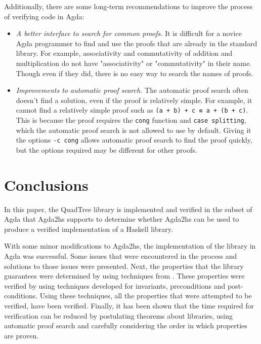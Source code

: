 Additionally, there are some long-term recommendations to improve the process of verifying code in Agda:
\begin{itemize}
	\item \textit{A better interface to search for common proofs.} It is difficult for a novice Agda programmer to find and use the proofs that are already in the standard library. For example, associativity and commutativity of addition and multiplication do not have "associativity" or "commutativity" in their name. Though even if they did, there is no easy way to search the names of proofs.
	\item \textit{Improvements to automatic proof search.} The automatic proof search often doesn't find a solution, even if the proof is relatively simple. For example, it cannot find a relatively simple proof such as \verb|(a + b) + c ≡ a + (b + c)|. This is because the proof requires the \verb|cong| function and \verb|case splitting|, which the automatic proof search is not allowed to use by default. Giving it the options \verb|-c cong| allows automatic proof search to find the proof quickly, but the options required may be different for other proofs.
\end{itemize}

\section{Conclusions}
In this paper, the QuadTree library is implemented and verified in the subset of Agda that Agda2hs supports to determine whether Agda2hs can be used to produce a verified implementation of a Haskell library. 

With some minor modifications to Agda2hs, the implementation of the library in Agda was successful. Some issues that were encountered in the process and solutions to those issues were presented. Next, the properties that the library guarantees were determined by using techniques from \cite{BREITNER2021}. These properties were verified by using techniques developed for invariants, preconditions and post-conditions.  Using these techniques, all the properties that were attempted to be verified, have been verified. Finally, it has been shown that the time required for verification can be reduced by postulating theorems about libraries, using automatic proof search and carefully considering the order in which properties are proven.

